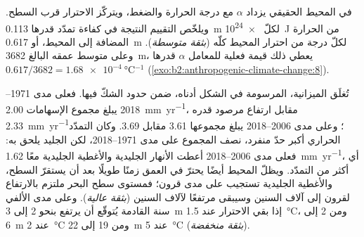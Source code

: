 في المحيط الحقيقي يزداد $\alpha$ مع درجة الحرارة والضغط، ويتركّز الاحترار قرب
السطح. ويلخّص التقييم النتيجة في كفاءة تمدّد قدرها \qty{0.113}{m} لكلّ
\qty{e24}{J} من الحرارة المضافة إلى المحيط، أو \qty{0.617}{m} لكلّ درجة من احترار المحيط كلّه
(\emph{بثقة متوسطة}). وعلى متوسط عمقه البالغ \qty{3682}{m}، يعطي ذلك قيمة فعلية للمعامل $\alpha$ قدرها
$0.617/3682 = \qty{1.68e-4}{\celsius^{-1}}$ (\cref{exo:b2:anthropogenic-climate-change:8}).

تُغلَق الميزانية، المرسومة في الشكل أدناه، ضمن حدود الشكّ فيها. فعلى مدى 1971--2018 يبلغ مجموع الإسهامات
\qty{2.00}{mm.yr^{-1}}، مقابل ارتفاع مرصود قدره \qty{2.33}{mm.yr^{-1}}؛ وعلى مدى 2006--2018
يبلغ مجموعها 3.61 مقابل 3.69. وكان التمدّد الحراري أكبر حدّ منفرد، نصف المجموع على مدى 1971--2018، لكن الجليد
يلحق به: فعلى مدى 2006--2018 أعطت الأنهار الجليدية والأغطية الجليدية معًا \qty{1.62}{mm.yr^{-1}}، أي أكثر من
التمدّد. ويظلّ المحيط أيضًا يحترّ في العمق زمنًا طويلًا بعد أن يستقرّ السطح، والأغطية
الجليدية تستجيب على مدى قرون؛ فمستوى سطح البحر ملتزم بالارتفاع لقرون إلى آلاف السنين وسيبقى
مرتفعًا لآلاف السنين (\emph{بثقة عالية}). وعلى مدى الألفي سنة القادمة
يُتوقّع أن يرتفع بنحو 2 إلى \qty{3}{m} إذا بقي الاحترار عند \qty{1.5}{\celsius}، ومن 2 إلى
\qty{6}{m} عند \qty{2}{\celsius} ومن 19 إلى \qty{22}{m} عند \qty{5}{\celsius} (\emph{بثقة منخفضة}).

